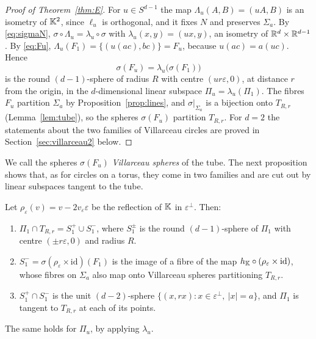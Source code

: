 \begin{proof}[Proof of Theorem~\ref{thm:E}]
For $u\in S^{d-1}$ the map $\Lambda_u(A,B)=(uA,B)$ is an isometry of $\mathbb{K}^2$, since $\ell_u$ is orthogonal, and it fixes $N$ and preserves $\Sigma_a$. By \eqref{eq:sigmaN}, $\sigma\circ\Lambda_u=\lambda_u\circ\sigma$ with $\lambda_u(x,y)=(ux,y)$, an isometry of $\mathbb{R}^d\times\mathbb{R}^{d-1}$. By \eqref{eq:Fu}, $\Lambda_u(F_1)=\{(u(ac),bc)\}=F_u$, because $u(ac)=a(uc)$. Hence
\[
\sigma(F_u)=\lambda_u\bigl(\sigma(F_1)\bigr)
\]
is the round $(d-1)$-sphere of radius $R$ with centre $(ur\varepsilon,0)$, at distance $r$ from the origin, in the $d$-dimensional linear subspace $\Pi_u=\lambda_u(\Pi_1)$. The fibres $F_u$ partition $\Sigma_a$ by Proposition~\ref{prop:lines}, and $\sigma|_{\Sigma_a}$ is a bijection onto $T_{R,r}$ (Lemma~\ref{lem:tube}), so the spheres $\sigma(F_u)$ partition $T_{R,r}$. For $d=2$ the statements about the two families of Villarceau circles are proved in Section~\ref{sec:villarceau2} below.
\end{proof}

We call the spheres $\sigma(F_u)$ \emph{Villarceau spheres} of the tube. The next proposition shows that, as for circles on a torus, they come in two families and are cut out by linear subspaces tangent to the tube.

\begin{proposition}\label{prop:twofamilies}
Let $\rho_\varepsilon(v)=v-2v_\varepsilon\varepsilon$ be the reflection of $\mathbb{K}$ in $\varepsilon^\perp$. Then:
\begin{enumerate}[label=\textup{(\roman*)}]
\item $\Pi_1\cap T_{R,r}=S_1^+\cup S_1^-$, where $S_1^\pm$ is the round $(d-1)$-sphere of $\Pi_1$ with centre $(\pm r\varepsilon,0)$ and radius $R$.
\item $S_1^-=\sigma(\rho_\varepsilon\times\mathrm{id})(F_1)$ is the image of a fibre of the map $h_{\mathbb{K}}\circ(\rho_\varepsilon\times\mathrm{id})$, whose fibres on $\Sigma_a$ also map onto Villarceau spheres partitioning $T_{R,r}$.
\item $S_1^+\cap S_1^-$ is the unit $(d-2)$-sphere $\{(x,rx):x\in\varepsilon^\perp,\ |x|=a\}$, and $\Pi_1$ is tangent to $T_{R,r}$ at each of its points.
\end{enumerate}
The same holds for $\Pi_u$, by applying $\lambda_u$.
\end{proposition}

